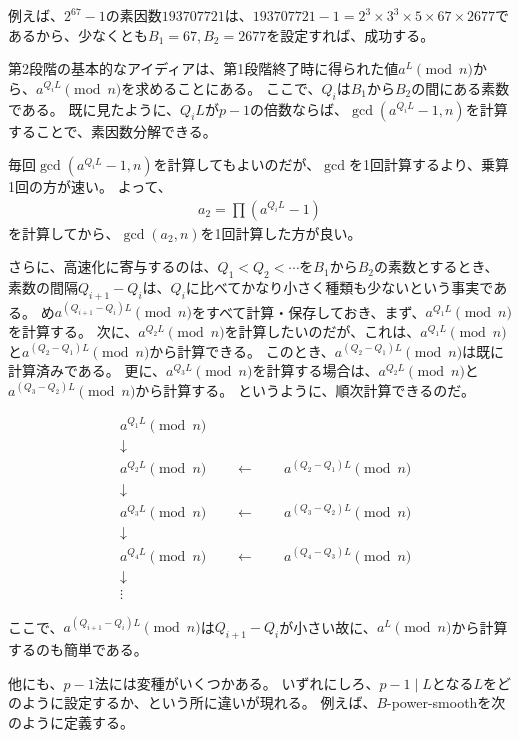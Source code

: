 例えば、$2^{67}-1$の素因数$193707721$は、$193707721-1=2^3\times3^3\times5\times67\times2677$であるから、少なくとも$B_1=67, B_2=2677$を設定すれば、成功する。

第2段階の基本的なアイディアは、第1段階終了時に得られた値$a^L\pmod{n}$から、$a^{Q_iL}\pmod{n}$を求めることにある。
ここで、$Q_i$は$B_1$から$B_2$の間にある素数である。
既に見たように、$Q_iL$が$p-1$の倍数ならば、$\gcd(a^{Q_iL}-1,n)$を計算することで、素因数分解できる。

毎回$\gcd(a^{Q_iL}-1,n)$を計算してもよいのだが、$\gcd$を1回計算するより、乗算1回の方が速い。
よって、
\begin{align*}
a_2 = \prod(a^{Q_iL}-1)
\end{align*}
を計算してから、$\gcd(a_2, n)$を1回計算した方が良い。

さらに、高速化に寄与するのは、$Q_1<Q_2<\cdots$を$B_1$から$B_2$の素数とするとき、素数の間隔$Q_{i+1}-Q_i$は、$Q_i$に比べてかなり小さく種類も少ないという事実である。
め$a^{(Q_{i+1}-Q_i)L}\pmod{n}$をすべて計算・保存しておき、まず、$a^{Q_1L}\pmod{n}$を計算する。
次に、$a^{Q_2L}\pmod{n}$を計算したいのだが、これは、$a^{Q_1L}\pmod{n}$と$a^{(Q_2-Q_1)L}\pmod{n}$から計算できる。
このとき、$a^{(Q_2-Q_1)L}\pmod{n}$は既に計算済みである。
更に、$a^{Q_3L}\pmod{n}$を計算する場合は、$a^{Q_2L}\pmod{n}$と$a^{(Q_3-Q_2)L}\pmod{n}$から計算する。
というように、順次計算できるのだ。

\begin{align*}
&a^{Q_1L}\pmod{n}\\
&\downarrow \\
&a^{Q_2L}\pmod{n} \qquad\leftarrow\qquad a^{(Q_2-Q_1)L}\pmod{n}\\
&\downarrow \\
&a^{Q_3L}\pmod{n} \qquad\leftarrow\qquad a^{(Q_3-Q_2)L}\pmod{n}\\
&\downarrow \\
&a^{Q_4L}\pmod{n} \qquad\leftarrow\qquad a^{(Q_4-Q_3)L}\pmod{n}\\
&\downarrow \\
&\vdots
\end{align*}

ここで、$a^{(Q_{i+1}-Q_i)L}\pmod{n}$は$Q_{i+1}-Q_i$が小さい故に、$a^L\pmod{n}$から計算するのも簡単である。


他にも、$p-1$法には変種がいくつかある。
いずれにしろ、$p-1\mid L$となる$L$をどのように設定するか、という所に違いが現れる。
例えば、$B$-power-smoothを次のように定義する。

